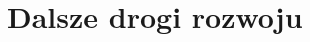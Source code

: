 \documentclass[./FM_mgr.tex]{subfiles}
\begin{document}
\chapter{Dalsze drogi rozwoju}
\end{document}
